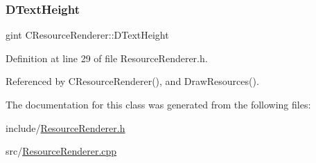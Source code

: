 \subsubsection{\texorpdfstring{D\+Text\+Height}{DTextHeight}}
{\footnotesize\ttfamily gint C\+Resource\+Renderer\+::\+D\+Text\+Height\hspace{0.3cm}{\ttfamily [protected]}}



Definition at line 29 of file Resource\+Renderer.\+h.



Referenced by C\+Resource\+Renderer(), and Draw\+Resources().



The documentation for this class was generated from the following files\+:\begin{DoxyCompactItemize}
\item 
include/\hyperlink{ResourceRenderer_8h}{Resource\+Renderer.\+h}\item 
src/\hyperlink{ResourceRenderer_8cpp}{Resource\+Renderer.\+cpp}\end{DoxyCompactItemize}
